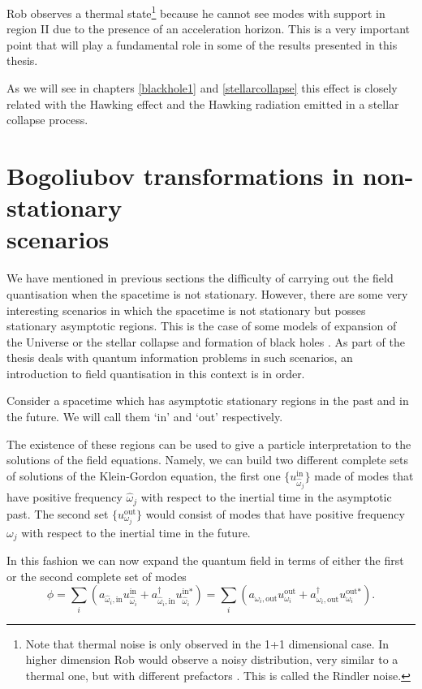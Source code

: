 Rob observes a thermal state\footnote{Note that thermal noise is only observed in the 1+1 dimensional case. In higher dimension Rob would observe a noisy distribution, very similar to a thermal one, but with different prefactors \cite{Takagi}. This is called the Rindler noise.} because he cannot see modes with support in region II due to the presence of an acceleration horizon. This is a very important point that will play a fundamental role in some of the results presented in this thesis. 

As we will see in chapters \ref{blackhole1} and \ref{stellarcollapse} this effect is closely related with the Hawking effect and the Hawking radiation emitted in a stellar collapse process.


\section[Bogoliubov transformations in non-stationary scenarios]{Bogoliubov transformations in non-stationary\\ scenarios}\label{nonstaint}

We have mentioned in previous sections the difficulty of carrying out the field quantisation when the spacetime is not stationary. However, there are some very interesting scenarios in which the spacetime is not stationary but posses stationary asymptotic regions. This is the case of some models of expansion of the Universe \cite{dun1} or the stellar collapse and formation of black holes \cite{NavarroSalas}. As part of the thesis deals with quantum information problems   in such scenarios, an introduction to field quantisation in this context is in order.

Consider a spacetime which has asymptotic stationary regions in the past and in the future. We will call them `in' and `out' respectively.

The existence of these regions can be used to give a particle interpretation to the solutions of the field equations. Namely, we can build two different complete sets of solutions of the Klein-Gordon equation, the first one $\{u_{\hat\omega_j}^{\text{in}}\}$ made of modes that have positive frequency $\hat\omega_j$ with respect to the inertial time in the asymptotic past. The second set $\{u_{\omega_j}^{\text{out}}\}$ would consist of modes that have positive frequency $\omega_j$ with respect to the inertial time in the future.

In this fashion we can now expand the quantum field in terms of either the first or the second complete set of modes
\begin{equation}\label{minkexp1}
\phi=\sum_i \left(a_{\hat\omega_i,\text{in}}u_{\hat\omega_i}^\text{in}+a_{\hat\omega_i,\text{in}}^\dagger u_{\hat\omega_i}^{\text{in}*}\right)=\sum_i \left(a_{\omega_i,\text{out}}u_{\omega_i}^\text{out}+a_{\omega_i,\text{out}}^\dagger u_{\omega_i}^{\text{out}*}\right).
\end{equation}

